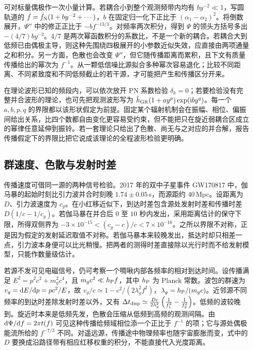 可对标量偶极作一次小量计算。若耦合小到整个观测频带内均有 $b y^{-2}\ll1$，写圆轨道的 $\dot f=\dot f_{\rm N}(1+b y^{-2}+\cdots)$，$b$ 在固定归一化下正比于 $(\alpha_1-\alpha_2)^2$。将倒数展开，$\Psi''$ 中的修正正比于 $-b f^{-13/3}$。对频率两次积分，得到 $\Psi$ 的领头方括号多出 $-(4/7)b y^{-2}$。$4/7$ 是两次幂函数积分的系数比，不是一个新的耦合。若耦合大到低频已由偶极主导，则这种先围绕四极展开的小参数近似失效，应直接由两项通量之和积分。另一方面，色散也会改变 $\Psi''$，但它随传播距离而累积，且下文有质量传播给出的幂次为 $f^{-1}$。从一颗低信噪比源拟合多种幂次容易退化；比较不同距离、不同紧致度和不同低频截止的若干源，才可能把产生和传播区分开来。

在理论波形已知的频段内，可以依次放开 PN 系数检验 $\delta_k=0$；若要检验没有完整并合波形的理论，也可先把观测波形写为 $\tilde h_{\rm GR}(1+a y^p)\exp(\mathrm i b y^q)$。每一个 $a,b,p,q$ 的界限都以该形状假定为前提。固定某个辐射机制会在振幅、相位、偏振间给出关系，比四个数都自由变化更容易受约束，但不能把只在旋近弱耦合区成立的幂律任意延伸到振铃。若一套理论只给出了色散、尚无与之对应的并合解，报告传播假定下的界限比把它说成该理论的全程波形检验更明确。

\subsection{群速度、色散与发射时差}

传播速度可借同一源的两种信号检验。2017 年的双中子星事件 GW170817 中，伽马暴的起始时刻比引力波并合时刻晚 $1.74\pm0.05$\,s，而源距约 $40$\,Mpc。设距离为 $D$、引力波速度为 $c_g$。在小红移近似下，到达时差包含源处发射时差和传播时差 $D(1/c-1/c_g)$。若伽马暴在并合后 $0$ 至 $10$ 秒内发出，采用距离估计的保守下限，所得双侧界为 $-3\times10^{-15}<(c_g-c)/c<7\times10^{-16}$。之所以界限不对称，正是因为假定的发射延迟取值不对称。若伽马暴本来较晚发出，抵达时却只相差一点，引力波本身便可以比光稍慢。把两者的测得时差直接除以光行时而不给发射模型，只能作数量级估计。

若源不发可见电磁信号，仍可考察一个啁啾内部各频率的相对到达时间。设传播满足 $E^2=p^2c^2+m_g^2c^4$，且 $m_gc^2\ll h_{\rm P} f$，其中 $h_{\rm P}$ 为 Planck 常数。波包的群速为 $v_g=\dd E/\dd p=pc^2/E$，故 $v_g/c\simeq1-c^2/(2\lambda_g^2 f^2)$，$\lambda_g=h_{\rm P}/(m_gc)$。近邻源不同频率的到达时差除发射时差以外，又有 $\Delta t_{\rm disp} \simeq \frac{Dc}{2\lambda_g^2} \left(\frac{1}{f_1^2}-\frac{1}{f_2^2}\right)$。低频的波较晚到。旋近时本来是低频先发，色散会压缩从低频到高频的观测间隔。由 $\dd\Psi/\dd f=2\pi t(f)$ 可见这种传播给频域相位添一个正比于 $f^{-1}$ 的项；它与源处偶极能流所给的 $f^{-7/3}$ 不同。对遥远源，传播途中物理频率也随宇宙膨胀而变，式中的 $D$ 要换成沿路径带有相应红移权重的积分，不能直接代入光度距离。

